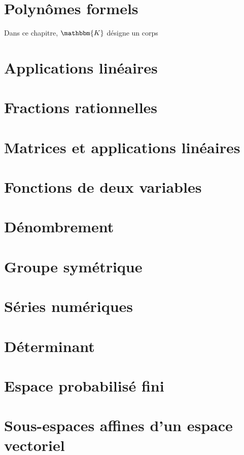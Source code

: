 \documentclass[a4paper]{report}
\newcommand{\chap}[2][0]{
	\setcounter{chapter}{#1 - 1}
	\chapter{#2}
	\renewcommand*\parttitle{#2}
}
\begin{document}
	{
		\chap[18]{Polynômes formels}
		\renewcommand{\cwd}{../chap18}
		Dans ce chapitre, $\mathbbm{K}$ désigne un corps
		
		
		
		
	}

	{
		\chap[19]{Applications linéaires}
		\renewcommand{\cwd}{../chap19}
		
		
		
		
		
	}

	{
		\chap[20]{Fractions rationnelles}
		\renewcommand{\cwd}{../chap20}
		
		
	}

	{
		\chap[21]{Matrices et applications linéaires}
		\renewcommand{\cwd}{../chap21}
		
		
		
		
		
		
	}

	{
		\chap[22]{Fonctions de deux variables}
		\renewcommand{\cwd}{../chap22}
		
		
		
	}

	{
		\chap[23]{Dénombrement}
		\renewcommand{\cwd}{../chap23}
		
		
		
		\addrecap
	}

	{
		\chap[24]{Groupe symétrique}
		\renewcommand{\cwd}{../chap24}
		
		
		
		
		\addrecap
	}

	{
		\chap[25]{Séries numériques}
		\renewcommand{\cwd}{../chap25}
		
		
		
		
		
		
		
		
	}

	{
		\chap[26]{Déterminant}
		\renewcommand{\cwd}{../chap26}
		
		
		
		
		
	}

	{
		\chap[27]{Espace probabilisé fini}
		\renewcommand{\cwd}{../chap27}
		\let\overlin\overline
		\let\overline\bar
		
		
		
		\addrecap
	}

	{
		\chap[28]{Sous-espaces affines d'un espace vectoriel}
		\renewcommand{\cwd}{../chap28}
		
		
		
		
	}
\end{document}
